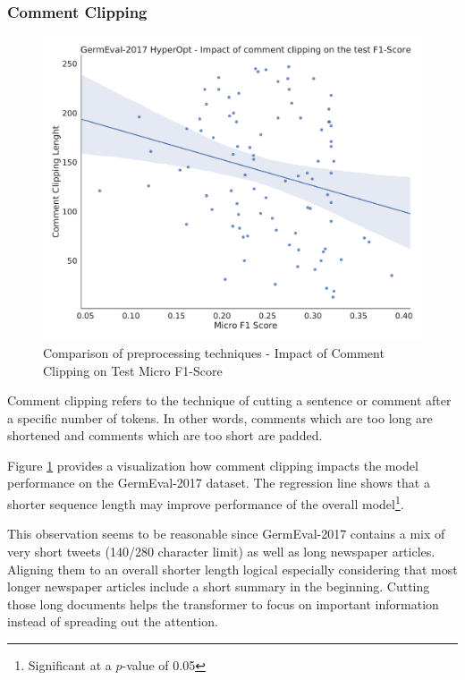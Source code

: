 \subsubsection{Comment Clipping}
\label{subsec:06_CommentClipping}

\begin{figure}
	\centering
	\includegraphics[width=\textwidth]{figures/06_results/06_hp_ge_lm_commentClipping_test}
	\caption{Comparison of preprocessing techniques - Impact of Comment Clipping on Test Micro F1-Score}
	\label{fig:06_PreprocessingCommentClipping}
\end{figure}

Comment clipping refers to the technique of cutting a sentence or comment after a specific number of tokens. In other words, comments which are too long are shortened and comments which are too short are padded.

Figure \ref{fig:06_PreprocessingCommentClipping} provides a visualization how comment clipping impacts the model performance on the GermEval-2017 dataset. The regression line shows that a shorter sequence length may improve performance of the overall model\footnote{Significant at a $p$-value of 0.05}.
\medskip

This observation seems to be reasonable since GermEval-2017 contains a mix of very short tweets {(140/280 character limit)} as well as long newspaper articles. Aligning them to an overall shorter length logical especially considering that most longer newspaper articles include a short summary in the beginning. Cutting those long documents helps the transformer to focus on important information instead of spreading out the attention.

